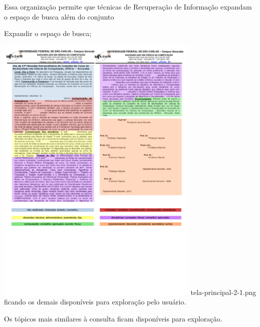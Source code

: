 Essa organização permite
que técnicas de Recuperação de Informação expandam o espaço de busca além do conjunto


Expandir o espaço de busca; 















		\includegraphics[trim={ 0 235 0 16 },clip,page=1,width=0.73\textwidth]{images/distribuicao.pdf}
tela-principal-2-1.png
ficando os demais disponíveis para exploração pelo usuário.

Os tópicos mais similares à consulta ficam disponíveis para exploração.


